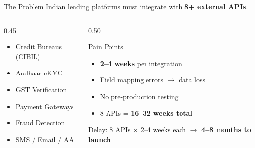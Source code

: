 \documentclass[aspectratio=169,11pt]{beamer}
\begin{document}
\begin{frame}{The Problem}
{\large Indian lending platforms must integrate with \textbf{8+ external APIs}.}
\vspace{0.4em}

\begin{columns}[T]
\begin{column}{0.45\textwidth}
\begin{itemize}
\item Credit Bureaus (CIBIL)
\item Aadhaar eKYC
\item GST Verification
\item Payment Gateways
\item Fraud Detection
\item SMS / Email / AA
\end{itemize}
\end{column}
\begin{column}{0.50\textwidth}
\begin{block}{\textcolor{err}{Pain Points}}
\begin{itemize}
\item \textbf{2--4 weeks} per integration
\item Field mapping errors $\to$ data loss
\item No pre-production testing
\item 8 APIs = \textbf{16--32 weeks total}
\end{itemize}
\end{block}
\vspace{0.3em}
{\small\textcolor{warn}{Delay:} 8 APIs $\times$ 2--4 weeks each $\to$ \textbf{4--8 months to launch}}
\end{column}
\end{columns}
\end{frame}
\end{document}
